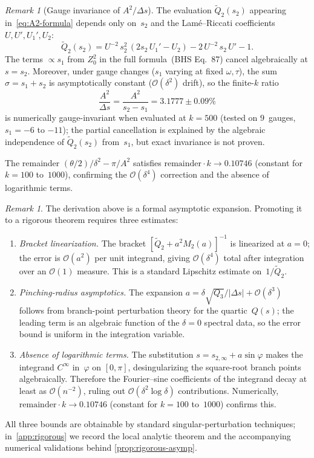\documentclass[11pt,a4paper]{article}
\theoremstyle{plain}
\theoremstyle{definition}
\theoremstyle{remark}
\newtheorem{remark}[theorem]{Remark}
\newcommand{\Oo}{\mathcal{O}}
\begin{document}
\begin{remark}[Gauge invariance of $A^2/\Delta s$]\label{obs:gauge-invariant}
  The evaluation $\tilde Q_2(s_2)$ appearing in~\eqref{eq:A2-formula}
  depends only on~$s_2$ and the Lam\'e--Riccati coefficients
  $U, U', U_1', U_2$:
  \[
    \tilde Q_2(s_2) = U^{-2}\,s_2^2\,(2s_2\,U_1' - U_2)
      - 2\,U^{-2}\,s_2\,U' - 1.
  \]
  The terms $\propto s_1$ from $Z_0^2$ in the full
  formula~\textup{(BHS Eq.~87)} cancel algebraically at $s = s_2$.
  Moreover, under gauge changes ($s_1$ varying at fixed $\omega, \tau$),
  the sum $\sigma = s_1 + s_2$ is asymptotically constant ($\Oo(\delta^2)$
  drift), so the finite-$k$ ratio
  \[
    \frac{A^2}{\Delta s} = \frac{A^2}{s_2 - s_1}
    = 3.1777 \pm 0.09\%
  \]
  is numerically gauge-invariant when evaluated at $k = 500$
  (tested on $9$~gauges, $s_1 = -6$ to $-11$);
  the partial cancellation is explained by
  the algebraic independence of $\tilde Q_2(s_2)$
  from~$s_1$, but exact invariance is not proven.
\end{remark}

The remainder $(\theta/2)/\delta^2 - \pi/A^2$ satisfies
$\mathrm{remainder}\cdot k \to 0.10746$ (constant for $k = 100$
to~$1000$), confirming the $\Oo(\delta^4)$ correction and the absence
of logarithmic terms.

\begin{remark}\label{rem:rigour-path}
  The derivation above is a formal asymptotic expansion.  Promoting
  it to a rigorous theorem requires three estimates:
  \begin{enumerate}[nosep,label=(\alph*)]
  \item \emph{Bracket linearization.}  The bracket
    $[\tilde Q_2 + a^2 M_2(a)]^{-1}$ is linearized at $a=0$;
    the error is $\Oo(a^2)$ per unit integrand, giving $\Oo(\delta^4)$
    total after integration over an $\Oo(1)$ measure.  This is a
    standard Lipschitz estimate on~$1/\tilde Q_2$.
  \item \emph{Pinching-radius asymptotics.}  The expansion
    $a = \delta\sqrt{Q_3}/|\Delta s| + \Oo(\delta^3)$ follows from
    branch-point perturbation theory for the quartic~$Q(s)$; the
    leading term is an algebraic function of the $\delta=0$ spectral
    data, so the error bound is uniform in the integration variable.
  \item \emph{Absence of logarithmic terms.}  The substitution
    $s = s_{2,\infty} + a\sin\varphi$ makes the integrand $C^\infty$
    in~$\varphi$ on $[0,\pi]$, desingularizing the square-root
    branch points algebraically.  Therefore
    the Fourier--sine coefficients of the integrand decay at least as
    $\Oo(n^{-2})$, ruling out $\Oo(\delta^2\log\delta)$ contributions.
    Numerically, $\mathrm{remainder}\cdot k \to 0.10746$ (constant
    for $k = 100$ to~$1000$) confirms this.
  \end{enumerate}
  All three bounds are obtainable by standard singular-perturbation
  techniques; in~\cref{app:rigorous} we record the local analytic
  theorem and the accompanying numerical validations behind
  \cref{prop:rigorous-asymp}.
\end{remark}
\end{document}
